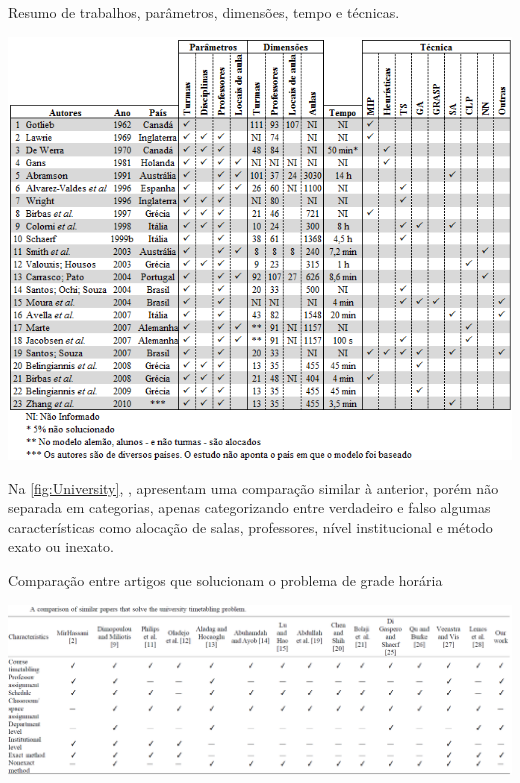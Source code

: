 \begin{CenteredFigure} \caption{Resumo de trabalhos, parâmetros, dimensões, tempo e técnicas.} \label{fig:Desenvolvimento}
  \includegraphics[width=\textwidth]{files/img/2.02!2-contexto/Desenvolvimento}
\end{CenteredFigure}    %

Na \autoref{fig:University}, , apresentam uma comparação similar à anterior, porém não separada em categorias, apenas categorizando entre verdadeiro e falso algumas características como alocação de salas, professores, nível institucional e método exato ou inexato.

\begin{CenteredFigure} \caption{Comparação entre artigos que solucionam o problema de grade horária} \label{fig:University}
  \includegraphics[width=\textwidth]{files/img/2.02!2-contexto/University}
\end{CenteredFigure}    %

